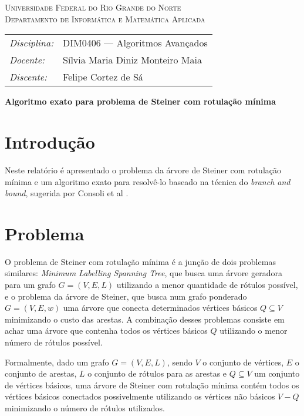 \documentclass[12pt, a4paper]{article}
\begin{document}
\begin{center}
    \textsc{Universidade Federal do Rio Grande do Norte} \\
    \textsc{Departamento de Informática e Matemática Aplicada}
\end{center}

\bigskip

\begin{tabular}{@{}ll@{}}
    \emph{Disciplina:} & DIM0406 --- Algoritmos Avançados \\
    \emph{Docente:}    & Sílvia Maria Diniz Monteiro Maia \\
    \emph{Discente:}   & Felipe Cortez de Sá \\
\end{tabular}

\bigskip

\begin{center}
\large \textbf{Algoritmo exato para problema de Steiner com rotulação mínima}
\end{center}

\section{Introdução}
Neste relatório é apresentado o problema da árvore de Steiner com rotulação
mínima e um algoritmo exato para resolvê-lo baseado na técnica do
\emph{branch and bound}, sugerida por Consoli et al \cite{consoli}.

\section{Problema}
O problema de Steiner com rotulação mínima é a junção de dois problemas
similares: \emph{Minimum Labelling Spanning Tree}, que busca uma árvore
geradora para um grafo $ G = (V, E, L) $ utilizando a menor quantidade de
rótulos possível, e o problema da árvore de Steiner, que busca num grafo
ponderado $ G = (V, E, w) $ uma árvore que conecta determinados vértices
básicos $ Q \subseteq V $ minimizando o custo das arestas. A combinação desses
problemas consiste em achar uma árvore que contenha todos os vértices básicos $
Q $ utilizando o menor número de rótulos possível.

Formalmente, dado um grafo $ G = (V, E, L) $, sendo $ V $ o conjunto de
vértices, $ E $ o conjunto de arestas, $ L $ o conjunto de rótulos para as
arestas e $ Q \subseteq V $ um conjunto de vértices básicos, uma árvore de
Steiner com rotulação mínima contém todos os vértices básicos conectados
possivelmente utilizando os vértices não básicos $ V - Q $ minimizando o número
de rótulos utilizados.
\end{document}
